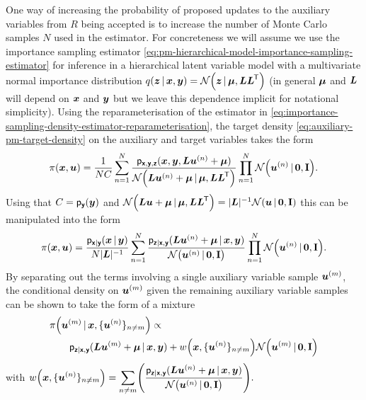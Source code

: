 One way of increasing the probability of proposed updates to the auxiliary variables from $R$ being accepted is to increase the number of Monte Carlo samples $N$ used in the estimator. For concreteness we will assume we use the importance sampling estimator \eqref{eq:pm-hierarchical-model-importance-sampling-estimator} for inference in a hierarchical latent variable model with a multivariate normal importance distribution $q(\vct{z}\gvn\vct{x},\vct{y}) = \nrm{\vct{z}\gvn\vct{\mu},\mtx{L}\mtx{L}\tr}$ (in general $\boldsymbol{\mu}$ and $\boldsymbol{L}$ will depend on $\boldsymbol{x}$ and $\boldsymbol{y}$ but we leave this dependence implicit for notational simplicity). Using the reparameterisation of the estimator in \eqref{eq:importance-sampling-density-estimator-reparameterisation}, the target density \eqref{eq:auxiliary-pm-target-density} on the auxiliary and target variables takes the form
\begin{equation}
  \pi(\vct{x},\vct{u}) = \frac{1}{NC} 
  \sum_{n=1}^N \frac{\pden{\rvct{x},\rvct{y},\rvct{z}}(\vct{x},\vct{y},\mtx{L}\vct{u}^{(n)} + \vct{\mu})}{\nrm{\mtx{L}\vct{u}^{(n)} + \vct{\mu} \gvn \vct{\mu},\mtx{L}\mtx{L}\tr}}
  \prod_{n=1}^N \nrm{\vct{u}^{(n)} \gvn \vct{0},\mathbf{I}}.
\end{equation}
Using that $C = \mathsf{p}_{\boldsymbol{\mathsf{y}}}(\boldsymbol{y})$ and $\nrm{\mtx{L}\vct{u} + \vct{\mu} \gvn \vct{\mu},\mtx{L}\mtx{L}\tr} = |\mtx{L}|^{-1} \nrm{\vct{u} \gvn \vct{0},\mathbf{I}}$ this can be manipulated into the form
\begin{equation*}
  \pi(\vct{x},\vct{u}) = \frac{\pden{\rvct{x}|\rvct{y}}(\vct{x}\gvn\vct{y})}{N|\mtx{L}|^{-1}} 
  \sum_{n=1}^N \frac{\pden{\rvct{z}|\rvct{x},\rvct{y}}(\mtx{L}\vct{u}^{(n)} + \vct{\mu}\gvn \vct{x},\vct{y})}{\nrm{\vct{u}^{(n)} \gvn \vct{0},\mathbf{I}}}
  \prod_{n=1}^N \nrm{\vct{u}^{(n)} \gvn \vct{0},\mathbf{I}}.
\end{equation*}
By separating out the terms involving a single auxiliary variable sample $\boldsymbol{u}^{(m)}$, the conditional density on $\boldsymbol{u}^{(m)}$ given the remaining auxiliary variable samples can be shown to take the form of a mixture
\begin{equation}
\begin{split}
  &\pi\lpa\vct{u}^{(m)} \gvn \vct{x},\lbrace \vct{u}^{(n)} \rbrace_{n\neq m} \rpa \propto \\
  &\qquad  
  \pden{\rvct{z}|\rvct{x},\rvct{y}}(\mtx{L}\vct{u}^{(m)} + \vct{\mu} \gvn \vct{x},\vct{y}) +
  w\lpa\vct{x},\lbrace \vct{u}^{(n)} \rbrace_{n\neq m}\rpa \nrm{\vct{u}^{(m)}\gvn \vct{0},\mathbf{I}}
\end{split}
\end{equation}
with \(\displaystyle
  w\lpa\vct{x},\lbrace \vct{u}^{(n)} \rbrace_{n\neq m}\rpa =
  \sum_{n\neq m}\lpa 
  \frac
    {\pden{\rvct{z}|\rvct{x},\rvct{y}}(\mtx{L}\vct{u}^{(n)} + \vct{\mu} \gvn \vct{x},\vct{y})}
    {\nrm{\vct{u}^{(n)}\gvn \vct{0},\mathbf{I}}}  
  \rpa.\)

